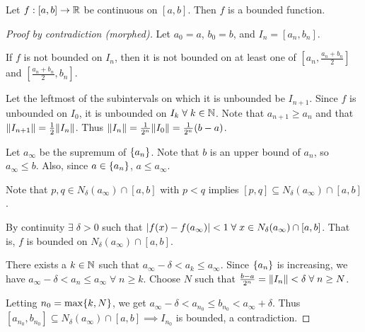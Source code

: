 \begin{thm} \label{thm:cont:compact->bounded}
    Let $f : [a, b] \to \mathbb{R}$ be continuous on $[a, b]$. Then $f$ is a bounded function.
\end{thm}
\begin{proof}[Proof by contradiction \textcolor{self_proof}{(morphed)}]
    Let $a_{0} = a$, $b_{0} = b$, and $I_{n} = [a_{n}, b_{n}]$.

    If $f$ is not bounded on $I_{n}$, then it is not bounded on at least one of $[a_{n}, \frac{a_{n} + b_{n}}{2}]$ and $[\frac{a_{n} + b_{n}}{2}, b_{n}]$.

    Let the leftmost of the subintervals on which it is unbounded be $I_{n+1}$.
    Since $f$ is unbounded on $I_{0}$, it is unbounded on $I_{k} \;\forall\; k \in \mathbb{N}$.
    Note that $a_{n+1} \geq a_{n}$ and that $\norm{I_{n+1}} = \frac{1}{2} \norm{I_{n}}$.
    Thus $\norm{I_{n}} = \frac{1}{2^{n}} \norm{I_{0}} = \frac{1}{2^{n}} (b - a)$.

    Let $a_{\infty}$ be the supremum of $\set{a_{n}}$.
    Note that $b$ is an upper bound of $a_{n}$, so $a_{\infty} \leq b$.
    Also, since $a \in \set{a_{n}}$, $a \leq a_{\infty}$.

    Note that $p, q \in N_{\delta}(a_{\infty}) \cap [a, b]$ with $p < q$ implies $[p, q] \subseteq N_{\delta}(a_{\infty}) \cap [a, b]$.

    By continuity $\exists\; \delta > 0$ such that $\abs{f(x) - f(a_{\infty})} < 1 \;\forall\; x \in N_{\delta}(a_{\infty}) \cap [a, b]$.
    That is, $f$ is bounded on $N_{\delta}(a_{\infty}) \cap [a, b]$.

    There exists a $k \in \mathbb{N}$ such that $a_{\infty} - \delta < a_{k} \leq a_{\infty}$.
    Since $\set{a_{n}}$ is increasing, we have $a_{\infty} - \delta < a_{n} \leq a_{\infty} \;\forall\; n \geq k$.
    Choose $N$ such that $\frac{b - a}{2^{n}} = \norm{I_{n}} < \delta \;\forall\; n \geq N$.

    Letting $n_{0} = \max \set{k, N}$, we get $a_{\infty} - \delta < a_{n_{0}} \leq b_{n_{0}} < a_{\infty} + \delta$.
    Thus $[a_{n_{0}}, b_{n_{0}}] \subseteq N_{\delta}(a_{\infty}) \cap [a, b] \implies I_{n_{0}}$ is bounded, a contradiction.
\end{proof}
